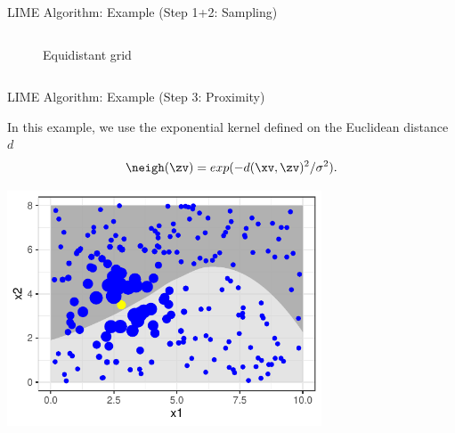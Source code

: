 \documentclass[11pt,compress,t,notes=noshow, aspectratio=169, xcolor=table]{beamer}
\begin{document}
\begin{frame}{LIME Algorithm: Example (Step 1+2: Sampling)}
\begin{columns}[totalwidth=\textwidth]
\begin{column}{0.5\textwidth}
\begin{figure}
			  \vspace{-0.3cm}
    		    \caption{Equidistant grid}
    		\end{figure}   
    \end{column}
\end{columns}
\end{frame}
		
\begin{frame}{LIME Algorithm: Example (Step 3: Proximity)}

	In this example, we use the exponential kernel defined on the Euclidean distance $d$
		 $$\neigh(\zv) = exp(-d(\xv, \zv)^2/\sigma^2).$$ 
		\begin{center}
			\includegraphics[width=0.7\textwidth]{figure/lime4}
		\end{center}
		
		
\end{frame}
		
\end{document}
